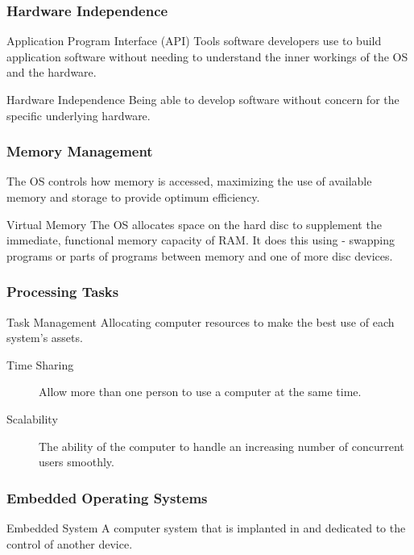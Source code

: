 \documentclass[\main/notes.tex]{subfiles}
\begin{document}
				\subsubsection{Hardware Independence}
					\begin{definition}{Application Program Interface (API)}
						Tools software developers use to build application software without needing to understand the inner workings of the OS and the hardware.
					\end{definition}
					\begin{definition}{Hardware Independence}
						Being able to develop software without concern for the specific underlying hardware.
					\end{definition}
				\subsubsection{Memory Management}
					The OS controls how memory is accessed, maximizing the use of available memory and storage to provide optimum efficiency.
					\begin{definition}{Virtual Memory}
						The OS allocates space on the hard disc to supplement the immediate, functional memory capacity of RAM. It does this using  - swapping programs or parts of programs between memory and one of more disc devices.
					\end{definition}
				\subsubsection{Processing Tasks}
					\begin{definition}{Task Management}
						Allocating computer resources to make the best use of each system's assets.
						\begin{description}
							\item[Time Sharing] Allow more than one person to use a computer at the same time.
							\item[Scalability] The ability of the computer to handle an increasing number of concurrent users smoothly.
						\end{description}
					\end{definition}
				\subsubsection{Embedded Operating Systems}
					\begin{definition}{Embedded System}
						A computer system that is implanted in and dedicated to the control of another device.
					\end{definition}
\end{document}
